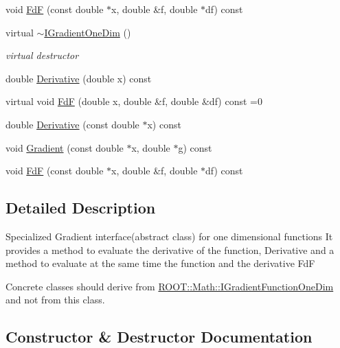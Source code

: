 \begin{DoxyCompactItemize}
\item 
void \mbox{\hyperlink{classROOT_1_1Math_1_1IGradientOneDim_a4d51d8a5bfdb547348b6da33008f6a9e}{FdF}} (const double $\ast$x, double \&f, double $\ast$df) const
\item 
virtual \mbox{\hyperlink{classROOT_1_1Math_1_1IGradientOneDim_ab3a9fce54752c72f4ee4ed520f5cb80f}{$\sim$\+I\+Gradient\+One\+Dim}} ()
\begin{DoxyCompactList}\small\item\em virtual destructor \end{DoxyCompactList}\item 
double \mbox{\hyperlink{classROOT_1_1Math_1_1IGradientOneDim_a1fd109c1ddc7bae1c647f096e1fd527f}{Derivative}} (double x) const
\item 
virtual void \mbox{\hyperlink{classROOT_1_1Math_1_1IGradientOneDim_aef5560ea7d43e64d94bf875713e2a5fc}{FdF}} (double x, double \&f, double \&df) const =0
\item 
double \mbox{\hyperlink{classROOT_1_1Math_1_1IGradientOneDim_ab28c444cba126cc1b380d21120dd437f}{Derivative}} (const double $\ast$x) const
\item 
void \mbox{\hyperlink{classROOT_1_1Math_1_1IGradientOneDim_ac00c2cdc7a93ea4358f2f1df8e3499eb}{Gradient}} (const double $\ast$x, double $\ast$g) const
\item 
void \mbox{\hyperlink{classROOT_1_1Math_1_1IGradientOneDim_a4d51d8a5bfdb547348b6da33008f6a9e}{FdF}} (const double $\ast$x, double \&f, double $\ast$df) const
\end{DoxyCompactItemize}


\subsection{Detailed Description}
Specialized Gradient interface(abstract class) for one dimensional functions It provides a method to evaluate the derivative of the function, Derivative and a method to evaluate at the same time the function and the derivative FdF

Concrete classes should derive from \mbox{\hyperlink{classROOT_1_1Math_1_1IGradientFunctionOneDim}{R\+O\+O\+T\+::\+Math\+::\+I\+Gradient\+Function\+One\+Dim}} and not from this class. 

\subsection{Constructor \& Destructor Documentation}
\mbox{\label{classROOT_1_1Math_1_1IGradientOneDim_ab3a9fce54752c72f4ee4ed520f5cb80f}} 
